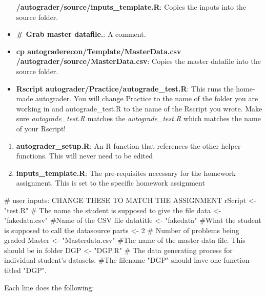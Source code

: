 \documentclass[
]{article}
\newenvironment{Shaded}{}{}
\newcommand{\CommentTok}[1]{\textcolor[rgb]{0.00,0.50,0.00}{#1}}
\newcommand{\DecValTok}[1]{#1}
\newcommand{\NormalTok}[1]{#1}
\newcommand{\StringTok}[1]{\textcolor[rgb]{0.00,0.50,0.50}{#1}}
\begin{document}
\begin{itemize}
  \textbf{/autograder/source/inputs\_template.R}: Copies the inputs into
  the source folder.
\item
  \textbf{\# Grab master datafile.}: A comment.
\item
  \textbf{cp autograderecon/Template/MasterData.csv
  /autograder/source/MasterData.csv}: Copies the master datafile into
  the source folder.
\item
  \textbf{Rscript autograder/Practice/autograde\_test.R}: This runs the
  home-made autograder. You will change Practice to the name of the
  folder you are working in and autograde\_test.R to the name of the
  Rscript you wrote. Make sure \emph{autograde\_test.R} matches the
  \emph{autograde\_test.R} which matches the name of your Rscript!
\end{itemize}

\begin{enumerate}
\def\labelenumi{(\arabic{enumi})}
\setcounter{enumi}{2}
\item
  \textbf{autograder\_setup.R}: An R function that references the other
  helper functions. This will never need to be edited
\item
  \textbf{inputs\_template.R}: The pre-requisites necessary for the
  homework assignment. This is set to the specific homework assignment
\end{enumerate}

\hypertarget{numCode}{%
\label{numCode}}%
\begin{Shaded}
\begin{Highlighting}[numbers=left,,]
\CommentTok{# user inputs: CHANGE THESE TO MATCH THE ASSIGNMENT}
\NormalTok{rScript   <-}\StringTok{ "test.R"} \CommentTok{# The name the student is supposed to give the file}
\NormalTok{data      <-}\StringTok{ "fakedata.csv"} \CommentTok{#Name of the CSV file}
\NormalTok{datatitle <-}\StringTok{ "fakedata"} \CommentTok{#What the student is supposed to call the datasource}
\NormalTok{parts     <-}\StringTok{ }\DecValTok{2} \CommentTok{# Number of problems being graded}
\NormalTok{Master    <-}\StringTok{ "Masterdata.csv"} \CommentTok{#The name of the master data file. This should be in folder}
\NormalTok{DGP       <-}\StringTok{ "DGP.R"} \CommentTok{# The data generating process for individual student's datasets. }
                     \CommentTok{#The filename "DGP" should have one function titled "DGP".}
\end{Highlighting}
\end{Shaded}

Each line does the following:
\end{document}
